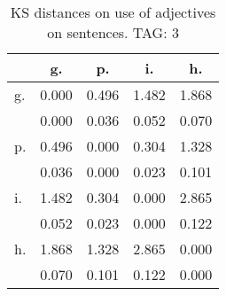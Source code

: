 \begin{table}[h!]
\begin{center}
\begin{tabular}{| l | c | c | c | c |}\hline
 & g. & p. & i. & h. \\\hline
g. & 0.000  & 0.496  & 1.482  & 1.868 \\\hline
 & 0.000  & 0.036  & 0.052  & 0.070 \\\hline
p. & 0.496  & 0.000  & 0.304  & 1.328 \\\hline
 & 0.036  & 0.000  & 0.023  & 0.101 \\\hline
i. & 1.482  & 0.304  & 0.000  & 2.865 \\\hline
 & 0.052  & 0.023  & 0.000  & 0.122 \\\hline
h. & 1.868  & 1.328  & 2.865  & 0.000 \\\hline
 & 0.070  & 0.101  & 0.122  & 0.000 \\\hline
\end{tabular}
\caption{KS distances on use of adjectives on sentences. TAG: 3}
\end{center}
\end{table}